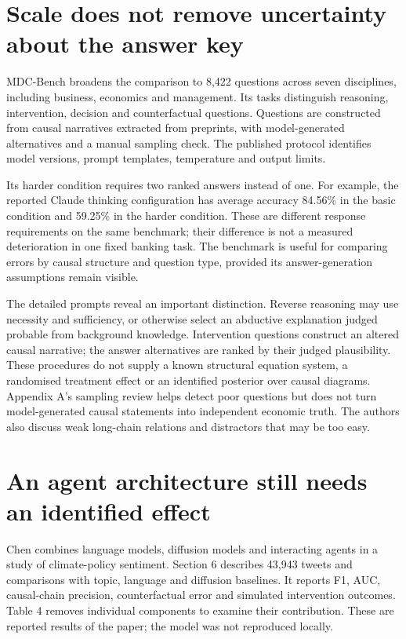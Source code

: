 \section{Scale does not remove uncertainty about the answer key}
MDC-Bench broadens the comparison to 8,422 questions across seven disciplines,
including business, economics and management. Its tasks distinguish reasoning,
intervention, decision and counterfactual questions. Questions are constructed
from causal narratives extracted from preprints, with model-generated
alternatives and a manual sampling check. The published protocol identifies
model versions, prompt templates, temperature and output limits.
\citep[Sections 2--3 and Appendix A]{gap29mdc}

Its harder condition requires two ranked answers instead of one. For example,
the reported Claude thinking configuration has average accuracy 84.56\% in
the basic condition and 59.25\% in the harder condition. These are different
response requirements on the same benchmark; their difference is not a
measured deterioration in one fixed banking task. The benchmark is useful
for comparing errors by causal structure and question type, provided its
answer-generation assumptions remain visible.

The detailed prompts reveal an important distinction. Reverse reasoning may
use necessity and sufficiency, or otherwise select an abductive explanation
judged probable from background knowledge. Intervention questions construct
an altered causal narrative; the answer alternatives are ranked by their
judged plausibility. These procedures do not supply a known structural
equation system, a randomised treatment effect or an identified posterior
over causal diagrams. Appendix A's sampling review helps detect poor
questions but does not turn model-generated causal statements into independent
economic truth. The authors also discuss weak long-chain relations and
distractors that may be too easy. \citep[Limitations; Tables 28--29 and
39--40]{gap29mdc}

\section{An agent architecture still needs an identified effect}
Chen combines language models, diffusion models and interacting agents in a
study of climate-policy sentiment. Section 6 describes 43,943 tweets and
comparisons with topic, language and diffusion baselines. It reports F1,
AUC, causal-chain precision, counterfactual error and simulated intervention
outcomes. Table 4 removes individual components to examine their contribution.
These are reported results of the paper; the model was not reproduced
locally. \citep[Sections 5.6 and 6; Tables 1--4]{gap29chen}

